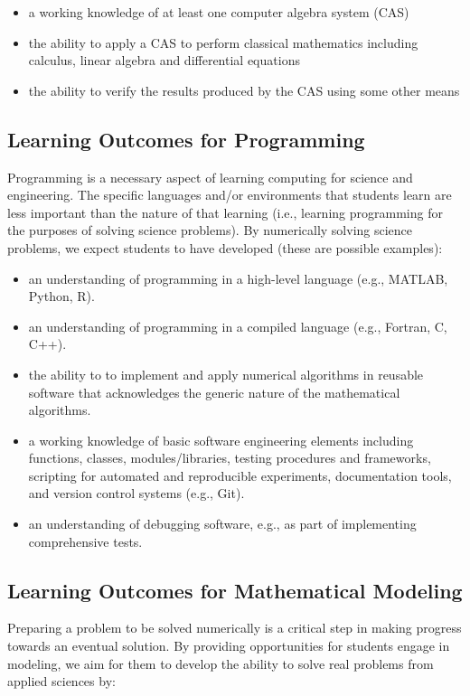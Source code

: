 \documentclass[graybox,envcountchap,sectrefs]{svmult}
\begin{document}
\begin{itemize}
\item a working knowledge of at least one computer algebra system (CAS)

\item the ability to apply a CAS to perform classical mathematics including calculus, linear algebra and differential equations

\item the ability to verify the results produced by the CAS using some other means
\end{itemize}


\subsection{Learning Outcomes for Programming}
Programming is a necessary aspect of learning computing  for science
and engineering. The specific languages and/or environments that
students learn are less important than the nature of that learning
(i.e., learning programming for the purposes of solving science
problems). By numerically solving science problems, we expect students
to have developed (these are possible examples):

\begin{itemize}
\item an understanding of programming in a high-level language (e.g., MATLAB, Python, R).

\item an understanding of programming in a compiled language (e.g., Fortran, C, C++).

\item the ability to to implement and apply numerical algorithms in reusable software that acknowledges the generic nature of the mathematical algorithms.

\item a working knowledge of basic software engineering elements including functions, classes, modules/libraries, testing procedures and frameworks, scripting for automated and reproducible experiments, documentation tools, and version control systems (e.g., Git).

\item an understanding of debugging software, e.g., as part of implementing comprehensive tests.
\end{itemize}


\subsection{Learning Outcomes for Mathematical Modeling}
Preparing a problem to be solved numerically is a critical step in making progress towards an eventual solution. By providing opportunities for students engage in modeling, we aim for them to develop the ability to solve real problems from applied sciences by:
\end{document}
